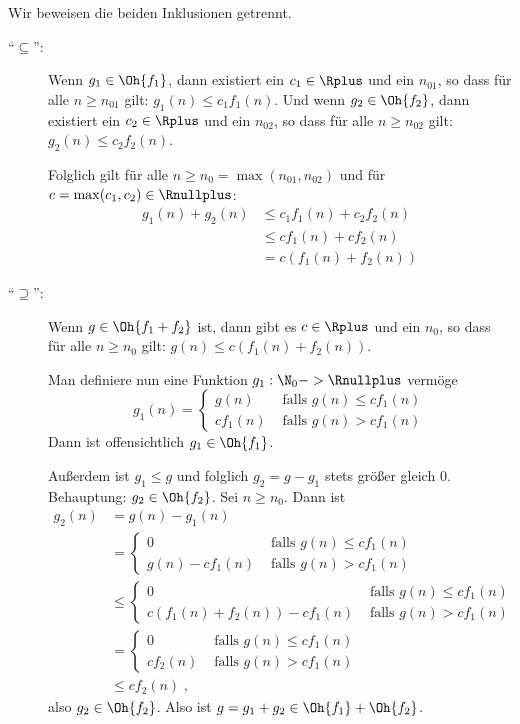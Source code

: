 \begin{beweis}[von Lemma~\ref{lem:O+O=O}]
  Wir beweisen die beiden Inklusionen getrennt.
  \begin{description}
  \item["`$\subseteq$"':] Wenn $g_1\in\Oh{f_1}$, dann existiert ein
    $c_1\in\Rplus$ und ein $n_{01}$, so dass für alle $n\geq n_{01}$ gilt:
    $g_1(n) \leq c_1 f_1(n)$. Und wenn $g_2\in\Oh{f_2}$, dann existiert ein
    $c_2\in\Rplus$ und ein $n_{02}$, so dass für alle $n\geq n_{02}$ gilt:
    $g_2(n) \leq c_2 f_2(n)$. 

    Folglich gilt für alle $n\geq n_0=\max(n_{01}, n_{02})$ und für
    $c=\max(c_1,c_2)\in\Rnullplus$:
    \begin{align*}
      g_1(n) + g_2(n) &\leq c_1 f_1(n) + c_2 f_2(n) \\
      &\leq c f_1(n) + c f_2(n) \\
      &= c(f_1(n) + f_2(n))
    \end{align*}
  \item["`$\supseteq$"':] Wenn $g\in\Oh{f_1+f_2}$ ist, dann gibt es
    $c\in\Rplus$ und ein $n_0$, so dass für alle $n\geq n_0$ gilt:
    $g(n)\leq c (f_1(n)+f_2(n))$.

    Man definiere nun eine Funktion $g_1:\N_0->\Rnullplus$ vermöge
    \[
    g_1(n) =
    \begin{cases}
      g(n) & \text{ falls } g(n) \leq cf_1(n) \\
      cf_1(n) & \text{ falls } g(n) > cf_1(n)
    \end{cases}
    \]
    Dann ist offensichtlich $g_1 \in\Oh{f_1}$. 

    Außerdem ist $g_1 \leq g$ und folglich $g_2=g -g_1$
    stets größer gleich $0$. Behauptung: $g_2\in\Oh{f_2}$. Sei $n\geq
    n_0$. Dann ist
    \begin{align*}
      g_2(n) &= g(n) -g_1(n) \\
      &=
      \begin{cases}
        0 & \text{ falls } g(n) \leq cf_1(n)\\
        g(n)-cf_1(n) & \text{ falls } g(n) > cf_1(n)
      \end{cases}\\
      &\leq
      \begin{cases}
        0 & \text{ falls } g(n) \leq cf_1(n)\\
        c (f_1(n)+f_2(n))-cf_1(n) & \text{ falls } g(n) > cf_1(n)
      \end{cases}\\ 
      &=
      \begin{cases}
        0 & \text{ falls } g(n) \leq cf_1(n)\\
        cf_2(n) & \text{ falls } g(n) > cf_1(n)
      \end{cases}\\ 
      &\leq cf_2(n) \;,
    \end{align*}
    also $g_2\in\Oh{f_2}$. Also ist $g=g_1+g_2\in\Oh{f_1}+\Oh{f_2}$.
  \end{description}
\end{beweis}
